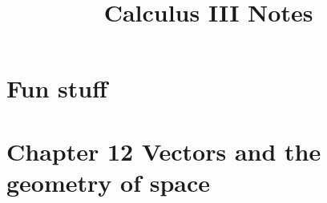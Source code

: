 \documentclass{article}
\title{Calculus III Notes}
\date
\begin{document}
\maketitle
\large

\tableofcontents


\section{Fun stuff}

\section{Chapter 12 Vectors and the geometry of space}
\end{document}
